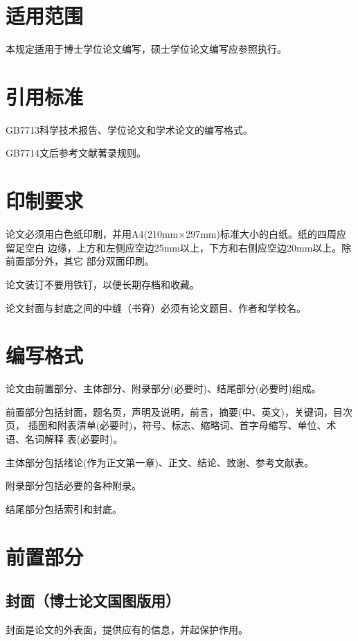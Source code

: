 \documentclass[master]{njuthesis}
\begin{document}
\section{适用范围}

本规定适用于博士学位论文编写，硕士学位论文编写应参照执行。

\section{引用标准}

GB7713科学技术报告、学位论文和学术论文的编写格式。

GB7714文后参考文献著录规则。

\section{印制要求}

论文必须用白色纸印刷，并用A4(210mm×297mm)标准大小的白纸。纸的四周应留足空白
边缘，上方和左侧应空边25mm以上，下方和右侧应空边20mm以上。除前置部分外，其它
部分双面印刷。

论文装订不要用铁钉，以便长期存档和收藏。

论文封面与封底之间的中缝（书脊）必须有论文题目、作者和学校名。

\section{编写格式}

论文由前置部分、主体部分、附录部分(必要时)、结尾部分(必要时)组成。

前置部分包括封面，题名页，声明及说明，前言，摘要(中、英文)，关键词，目次页，
插图和附表清单(必要时)，符号、标志、缩略词、首字母缩写、单位、术语、名词解释
表(必要时)。

主体部分包括绪论(作为正文第一章)、正文、结论、致谢、参考文献表。

附录部分包括必要的各种附录。

结尾部分包括索引和封底。

\section{前置部分}

\subsection{封面（博士论文国图版用）}

封面是论文的外表面，提供应有的信息，并起保护作用。
\end{document}
